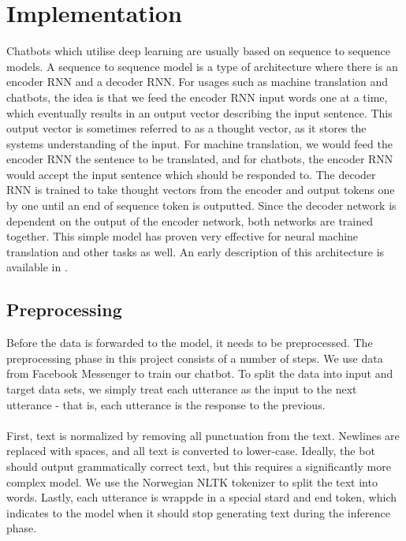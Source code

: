 \documentclass{article}
\begin{document}
\section{Implementation}

Chatbots which utilise deep learning are usually based on sequence to sequence
models. A sequence to sequence model is a type of architecture where there is
an encoder RNN and a decoder RNN. For usages such as machine translation and
chatbots, the idea is that we feed the encoder RNN input words one at a time,
which eventually results in an output vector describing the input sentence.
This output vector is sometimes referred to as a thought vector, as it stores
the systems understanding of the input. For machine translation, we would feed
the encoder RNN the sentence to be translated, and for chatbots, the encoder
RNN would accept the input sentence which should be responded to. The decoder
RNN is trained to take thought vectors from the encoder and output tokens
one by one until an end of sequence token is outputted. Since the decoder
network is dependent on the output of the encoder network, both networks are
trained together. This simple model has proven very effective for neural
machine translation and other tasks as well. An early description of this
architecture is available in \cite{Cho2014}.

\subsection{Preprocessing}

Before the data is forwarded to the model, it needs to be preprocessed. The
preprocessing phase in this project consists of a number of steps. We use
data from Facebook Messenger to train our chatbot. To split the data into
input and target data sets, we simply treat each utterance as the input to
the next utterance - that is, each utterance is the response to the previous.

\paragraph{}
First, text is normalized by removing all punctuation from the text. Newlines
are replaced with spaces, and all text is converted to lower-case. Ideally,
the bot should output grammatically correct text, but this requires a
significantly more complex model. We use the Norwegian NLTK tokenizer to split
the text into words. Lastly, each utterance is wrappde in a special stard and
end token, which indicates to the model when it should stop generating text
during the inference phase.
\end{document}
